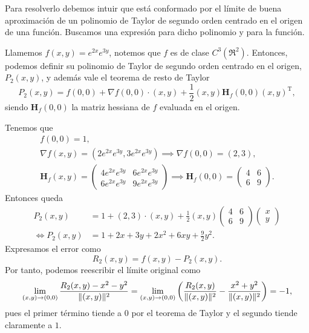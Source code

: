 
\begin{solution}
    Para resolverlo debemos intuir que está conformado por el límite de buena aproximación de un polinomio de Taylor de segundo orden centrado en el origen de una función. Buscamos una expresión para dicho polinomio y para la función.

    Llamemos $f(x,y) = e^{2x}e^{3y}$, notemos que $f$ es de clase $C^3(\Re^{2}).$  Entonces, podemos definir su polinomio de Taylor de segundo orden centrado en el origen, $ P_2(x,y)$, y adem\'as vale el teorema de resto de Taylor
    \[
        P_2(x,y) = f(0,0) + \nabla f(0,0)\cdot(x,y) + \frac{1}{2}(x,y)\boldsymbol{H}_f(0,0)(x,y)^\mathrm{T},
    \]
    siendo $\boldsymbol{H}_f(0,0)$ la matriz hessiana de $f$ evaluada en el origen.

    Tenemos que
    \begin{gather*}
        f(0,0) = 1,\\[.2cm]
        \nabla f(x,y) = \left(2e^{2x}e^{3y}, 3e^{2x}e^{3y}\right) \implies \nabla f(0,0) = (2,3),\\[.25cm]
        \boldsymbol{H}_f(x,y) = \left(\begin{array}{cc}
                4e^{2x}e^{3y} & 6e^{2x}e^{3y} \\[10pt]
                6e^{2x}e^{3y} & 9e^{2x}e^{3y}
            \end{array}\right) \implies \boldsymbol{H}_f(0,0) = \left(\begin{array}{cc}
                4 & 6 \\
                6 & 9
            \end{array}\right).
    \end{gather*}
    Entonces queda
    \[
        \begin{aligned}
            P_2(x,y)      & = 1+(2,3)\cdot(x,y)+\frac{1}{2}(x,y)
            \left(\begin{array}{cc}  
                    4 & 6 \\
                    6 & 9
                \end{array}\right)
            \left(\begin{array}{cc}
                          x \\
                          y
                      \end{array}\right)                                                     \\[4pt]
            \iff P_2(x,y) & = 1 + 2x + 3y + 2x^2 + 6xy + \frac{9}{2}y^2.
        \end{aligned}
    \]
    Expresamos el error como
    \[
        R_2(x,y) = f(x,y) - P_2(x,y).
    \]
    Por tanto, podemos reescribir el límite original como
    \[\\[2pt]
        \lim_{(x,y) \to (0,0)} \frac{R_2(x,y) - x^2 - y^2}{\|(x,y)\|^2} =
        \lim_{(x,y) \to (0,0)} \left( \frac{R_2(x,y)}{\|(x,y)\|^2} - \frac{x^2+y^2}{\|(x,y)\|^2} \right) = -1,
    \]
    pues el primer término tiende a 0 por el teorema de Taylor  y el segundo  tiende claramente a $1.$
\end{solution}

